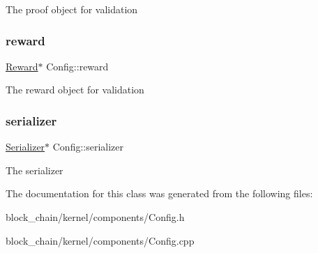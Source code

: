 The proof object for validation \mbox{\label{classConfig_a6b3fb8d8312246a1b204d04bd872a187}} 
\subsubsection{\texorpdfstring{reward}{reward}}
{\footnotesize\ttfamily \mbox{\hyperlink{classReward}{Reward}}$\ast$ Config\+::reward\hspace{0.3cm}{\ttfamily [protected]}}

The reward object for validation \mbox{\label{classConfig_afcd74e506e51f57020bce34fe92cb9dc}} 
\subsubsection{\texorpdfstring{serializer}{serializer}}
{\footnotesize\ttfamily \mbox{\hyperlink{classSerializer}{Serializer}}$\ast$ Config\+::serializer\hspace{0.3cm}{\ttfamily [protected]}}

The serializer 

The documentation for this class was generated from the following files\+:\begin{DoxyCompactItemize}
\item 
block\+\_\+chain/kernel/components/Config.\+h\item 
block\+\_\+chain/kernel/components/Config.\+cpp\end{DoxyCompactItemize}
